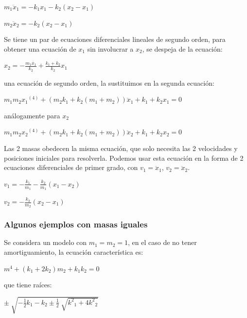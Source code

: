 \documentclass[a4paper]{article}
\begin{document}
\begin{center}
	$m_1 \ddot{x}_1 = - k_1 x_1 - k_2 (x_2 - x_1)$

	$m_2 \ddot{x}_2 = -k_2 (x_2 - x_1)$
\end{center}

Se tiene un par de ecuaciones diferenciales lineales de segundo orden, para obtener una ecuación de $x_1$ sin involucrar a $x_2$, se despeja de la ecuación:

\begin{center}
	$x_2 = -\frac{m_1 \ddot{x_1}}{k_2} + \frac{k_1 + k_2}{k_2} x_1$
\end{center}

una ecuación de segundo orden, la sustituimos en la segunda ecuación:

\begin{center}
$m_1 m_2 {x_1}^{(4)} + (m_2 k_1 + k_2 (m_1 + m_2)) \ddot{x}_1 + k_1 + k_2 x_1 = 0$
\end{center}

análogamente para $x_2$

\begin{center}
$m_1 m_2 {x_2}^{(4)} + (m_2 k_1 + k_2 (m_1 + m_2)) \ddot{x}_2 + k_1 + k_2 x_2 = 0$
\end{center}

Las 2 masas obedecen la misma ecuación, que solo necesita las 2 velocidades y posiciones iniciales para resolverla.  Podemos usar esta ecuación en la forma de 2 ecuaciones diferenciales de primer grado, con $v_1 = \ddot{x}_1$, $v_2 = \ddot{x}_2$.

\begin{center}
$v_1 = -\frac{k_1}{m_1} - \frac{k_2}{m_1} (x_1 - x_2)$

$v_2 = -\frac{k_2}{m_2} (x_2 - x_1)$
\end{center}

\subsubsection{Algunos ejemplos con masas iguales}

Se considera un modelo con $m_1 = m_2 = 1$, en el caso de no tener amortiguamiento, la ecuación característica es:

\begin{center}
$m^4 + (k_1 + 2 k_2) m_2 + k_1 k_2 = 0$
\end{center}

que tiene raíces: 

\begin{center}
$\pm \sqrt[]{-\frac{1}{2} k_1 - k_2 \pm \frac{1}{2} \sqrt[]{{k^2}_1 +4 {k^2}_2}}$
\end{center}
\end{document}
